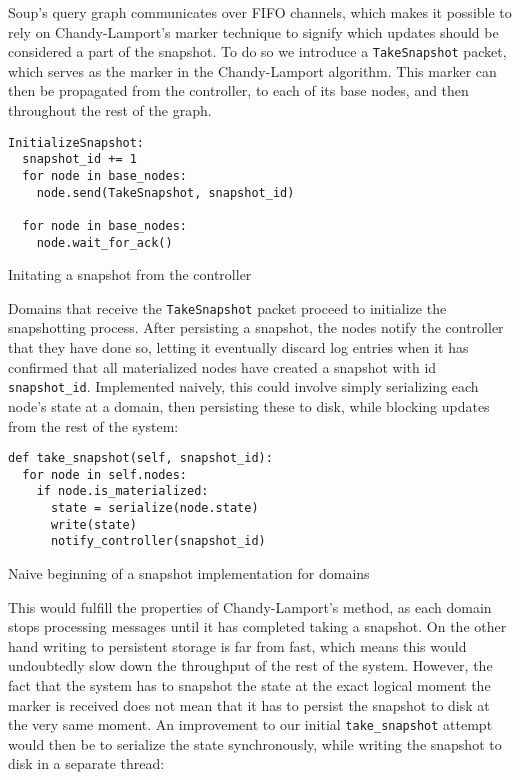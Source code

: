 \documentclass[b5paper]{report}
\begin{document}
Soup's query graph communicates over FIFO channels, which makes it possible to
rely on Chandy-Lamport's marker technique to signify which updates should be
considered a part of the snapshot. To do so we introduce a \texttt{TakeSnapshot}
packet, which serves as the marker in the Chandy-Lamport algorithm. This marker
can then be propagated from the controller, to each of its base nodes, and then
throughout the rest of the graph.

\begin{listing}[H]
  \begin{verbatim}
InitializeSnapshot:
  snapshot_id += 1
  for node in base_nodes:
    node.send(TakeSnapshot, snapshot_id)

  for node in base_nodes:
    node.wait_for_ack()
  \end{verbatim}

  \caption{Initating a snapshot from the controller}
\end{listing}

Domains that receive the \texttt{TakeSnapshot} packet proceed to initialize the
snapshotting process. After persisting a snapshot, the nodes notify the
controller that they have done so, letting it eventually discard log entries
when it has confirmed that all materialized nodes have created a snapshot with
id \texttt{snapshot\_id}. Implemented naively, this could involve simply
serializing each node's state at a domain, then persisting these to disk, while
blocking updates from the rest of the system:

\begin{listing}[H]
  \begin{verbatim}
def take_snapshot(self, snapshot_id):
  for node in self.nodes:
    if node.is_materialized:
      state = serialize(node.state)
      write(state)
      notify_controller(snapshot_id)
  \end{verbatim}
  \caption{Naive beginning of a snapshot implementation for domains}
\end{listing}

This would fulfill the properties of Chandy-Lamport's method, as each domain
stops processing messages until it has completed taking a snapshot. On the other
hand writing to persistent storage is far from fast, which means this would
undoubtedly slow down the throughput of the rest of the system. However, the
fact that the system has to snapshot the state at the exact logical moment the
marker is received does not mean that it has to persist the snapshot to disk at
the very same moment. An improvement to our initial \texttt{take\_snapshot}
attempt would then be to serialize the state synchronously, while writing the
snapshot to disk in a separate thread:
\end{document}
